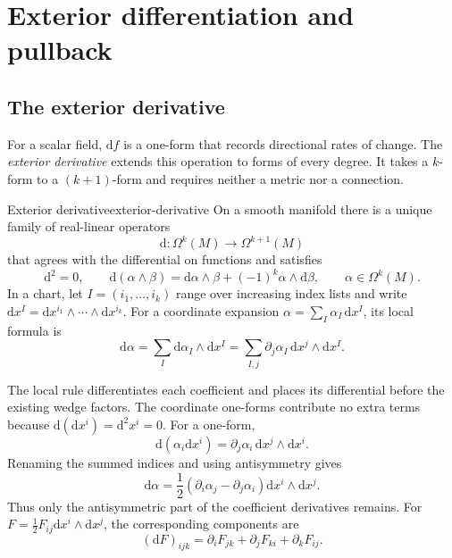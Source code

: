 \documentclass[11pt,a4paper]{article}
\numberwithin{equation}{section}
\newcommand{\dd}{\mathrm d}
\newcommand{\slideref}[1]{\par\nobreak\smallskip\nobreak{\footnotesize\color{ink!60}\textsc{Source slide #1}}\par\nobreak\smallskip\nobreak}
\begin{document}
\section{Exterior differentiation and pullback}
\label{sec:exterior}
\slideref{16}

\subsection{The exterior derivative}

For a scalar field, \(\dd f\) is a one-form that records directional
rates of change. The \emph{exterior derivative} extends this operation
to forms of every degree. It takes a \(k\)-form to a \((k+1)\)-form
and requires neither a metric nor a connection.

\begin{theorem}{Exterior derivative}{exterior-derivative}
On a smooth manifold there is a unique family of real-linear operators
\[
 \dd:\Omega^k(M)\longrightarrow\Omega^{k+1}(M)
\]
that agrees with the differential on functions and satisfies
\[
 \dd^2=0,\qquad
 \dd(\alpha\wedge\beta)
 =\dd\alpha\wedge\beta+(-1)^k\alpha\wedge\dd\beta,
 \qquad \alpha\in\Omega^k(M).
\]
In a chart, let \(I=(i_1,\ldots,i_k)\) range over increasing index
lists and write
\(\dd x^I=\dd x^{i_1}\wedge\cdots\wedge\dd x^{i_k}\).
For a coordinate expansion
\(\alpha=\sum_I\alpha_I\,\dd x^I\), its local formula is
\begin{equation}
 \dd\alpha
 =\sum_I\dd\alpha_I\wedge\dd x^I
 =\sum_{I,j}\partial_j\alpha_I\,\dd x^j\wedge\dd x^I.
 \label{eq:exterior-local}
\end{equation}
\end{theorem}

The local rule differentiates each coefficient and places its
differential before the existing wedge factors. The coordinate one-forms
contribute no extra terms because \(\dd(\dd x^i)=\dd^2x^i=0\).
For a one-form,
\[
 \dd(\alpha_i\dd x^i)
 =\partial_j\alpha_i\,\dd x^j\wedge\dd x^i.
\]
Renaming the summed indices and using antisymmetry gives
\begin{equation}
 \dd\alpha
 =\frac12(\partial_i\alpha_j-\partial_j\alpha_i)
           \dd x^i\wedge\dd x^j.
 \label{eq:d-oneform}
\end{equation}
Thus only the antisymmetric part of the coefficient derivatives remains.
For \(F=\tfrac12F_{ij}\dd x^i\wedge\dd x^j\), the corresponding
components are
\[
 (\dd F)_{ijk}
 =\partial_iF_{jk}+\partial_jF_{ki}+\partial_kF_{ij}.
\]
\end{document}

